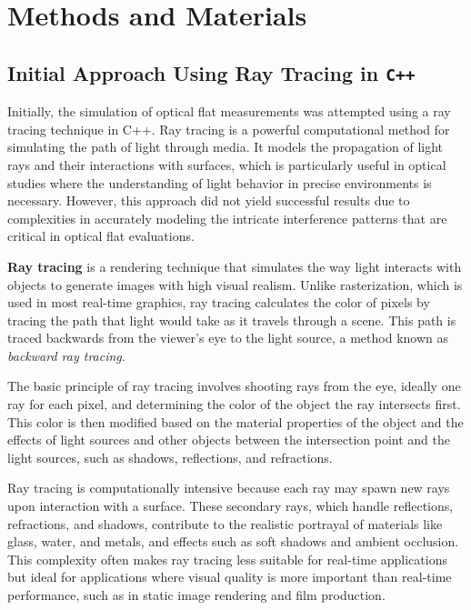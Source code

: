 \documentclass[../main.tex]{subfiles}
\begin{document}
\chapter{Methods and Materials}

\section{Initial Approach Using Ray Tracing in \texttt{C++}}
Initially, the simulation of optical flat measurements was attempted using a ray tracing technique in C++. Ray tracing is a powerful computational method for simulating the path of light through media. It models the propagation of light rays and their interactions with surfaces, which is particularly useful in optical studies where the understanding of light behavior in precise environments is necessary. However, this approach did not yield successful results due to complexities in accurately modeling the intricate interference patterns that are critical in optical flat evaluations.

\textbf{Ray tracing} is a rendering technique that simulates the way light interacts with objects to generate images with high visual realism. Unlike rasterization, which is used in most real-time graphics, ray tracing calculates the color of pixels by tracing the path that light would take as it travels through a scene. This path is traced backwards from the viewer's eye to the light source, a method known as \textit{backward ray tracing}.

The basic principle of ray tracing involves shooting rays from the eye, ideally one ray for each pixel, and determining the color of the object the ray intersects first. This color is then modified based on the material properties of the object and the effects of light sources and other objects between the intersection point and the light sources, such as shadows, reflections, and refractions.

Ray tracing is computationally intensive because each ray may spawn new rays upon interaction with a surface. These secondary rays, which handle reflections, refractions, and shadows, contribute to the realistic portrayal of materials like glass, water, and metals, and effects such as soft shadows and ambient occlusion. This complexity often makes ray tracing less suitable for real-time applications but ideal for applications where visual quality is more important than real-time performance, such as in static image rendering and film production.
\end{document}

